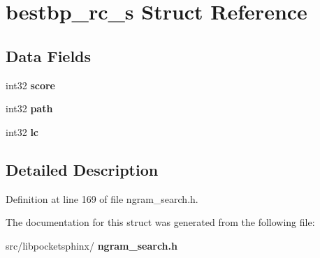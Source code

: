 \section{bestbp\+\_\+rc\+\_\+s Struct Reference}
\label{structbestbp__rc__s}
\subsection*{Data Fields}
\begin{DoxyCompactItemize}
\item 
\mbox{\label{structbestbp__rc__s_a22fb17e130599acbde1fac4debcca469}} 
int32 {\bfseries score}
\item 
\mbox{\label{structbestbp__rc__s_a3cc3a67aa32da9669c5305f7ebb2e7ce}} 
int32 {\bfseries path}
\item 
\mbox{\label{structbestbp__rc__s_a33fd8891076deb0d592e038cddca66a4}} 
int32 {\bfseries lc}
\end{DoxyCompactItemize}


\subsection{Detailed Description}


Definition at line 169 of file ngram\+\_\+search.\+h.



The documentation for this struct was generated from the following file\+:\begin{DoxyCompactItemize}
\item 
src/libpocketsphinx/\textbf{ ngram\+\_\+search.\+h}\end{DoxyCompactItemize}
